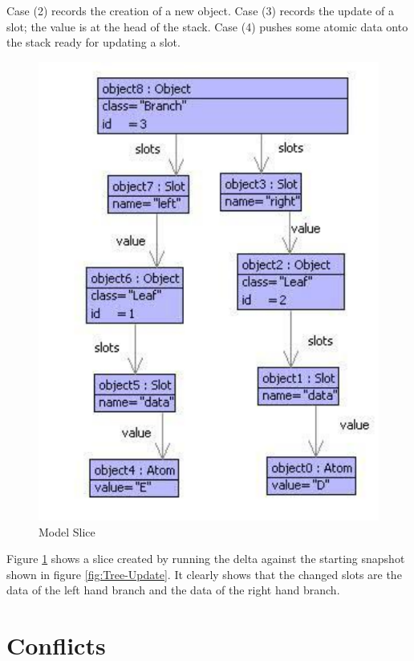 Case (2) records the creation of a new object. Case (3) records the
update of a slot; the value is at the head of the stack. Case (4)
pushes some atomic data onto the stack ready for updating a slot.

%
\begin{figure}
\begin{center}

\includegraphics[width=12cm]{Programming/Teams/Images/SlicedSnapshot.pdf}

\caption{Model Slice\label{fig:SlicedModel}}

\end{center}
\end{figure}


Figure \ref{fig:SlicedModel} shows a slice created by running the
delta against the starting snapshot shown in figure \ref{fig:Tree-Update}.
It clearly shows that the changed slots are the data of the left hand
branch and the data of the right hand branch.


\section{Conflicts}

